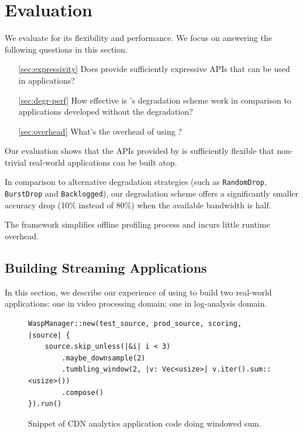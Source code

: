 \section{Evaluation}
\label{sec:evaluation}

We evaluate \sysname{} for its flexibility and performance. We focus on
answering the following questions in this section.

\begin{itemize}[leftmargin=30pt]
\item[\autoref{sec:expressivity}] Does \sysname{} provide sufficiently expressive
  APIs that can be used in applications?
\item[\autoref{sec:degr-perf}] How effective is \sysname{}'s degradation scheme
  work in comparison to applications developed without the degradation?
\item[\autoref{sec:overhead}] What's the overhead of using \sysname{}?
\end{itemize}

Our evaluation shows that the APIs provided by \sysname{} is sufficiently
flexible that non-trivial real-world applications can be built atop.

In comparison to alternative degradation strategies (such as
\texttt{RandomDrop}, \texttt{BurstDrop} and \texttt{Backlogged}), our
degradation scheme offers a significantly smaller accuracy drop (10\% instead of
80\%) when the available bandwidth is half.

The framework simplifies offline profiling process and incurs little runtime
overhead.

\subsection{Building Streaming Applications}
\label{sec:expressivity}

In this section, we describe our experience of using \sysname{} to build two
real-world applications: one in video processing domain; one in log-analysis
domain.

\begin{figure}
  \begin{lstlisting}
WaspManager::new(test_source, prod_source, scoring, |source| {
    source.skip_unless(|&i| i < 3)
        .maybe_downsample(2)
        .tumbling_window(2, |v: Vec<usize>| v.iter().sum::<usize>())
        .compose()
}).run()
  \end{lstlisting}
  \caption{Snippet of CDN analytics application code doing windowed sum.}
  \label{fig:cdn-code}
\end{figure}

